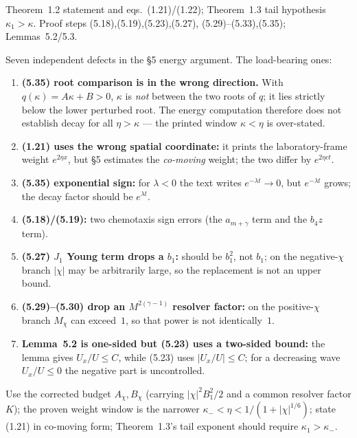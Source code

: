\documentclass[11pt]{article}
\begin{document}
\begin{fields}
\item[Location] Theorem~1.2 statement and eqs.~(1.21)/(1.22); Theorem~1.3 tail
  hypothesis $\kappa_1>\kappa$. Proof steps (5.18),(5.19),(5.23),(5.27),
  (5.29)--(5.33),(5.35); Lemmas~5.2/5.3.
\item[What is wrong] Seven independent defects in the \S5 energy argument. The
  load-bearing ones:
  \begin{enumerate}[leftmargin=1.6em,itemsep=1pt]
  \item \textbf{(5.35) root comparison is in the wrong direction.} With
    $q(\kappa)=A\kappa+B>0$, $\kappa$ is \emph{not} between the two roots of $q$;
    it lies strictly below the lower perturbed root. The energy computation
    therefore does not establish decay for all $\eta>\kappa$ --- the printed
    window $\kappa<\eta$ is over-stated.
  \item \textbf{(1.21) uses the wrong spatial coordinate:} it prints the
    laboratory-frame weight $e^{2\eta x}$, but \S5 estimates the \emph{co-moving}
    weight; the two differ by $e^{2\eta ct}$.
  \item \textbf{(5.35) exponential sign:} for $\lambda<0$ the text writes
    $e^{-\lambda t}\to0$, but $e^{-\lambda t}$ grows; the decay factor should be
    $e^{\lambda t}$.
  \item \textbf{(5.18)/(5.19):} two chemotaxis sign errors (the $a_{m+\gamma}$
    term and the $b_4z$ term).
  \item \textbf{(5.27) $J_1$ Young term drops a $b_1$:} should be $b_1^2$, not
    $b_1$; on the negative-$\chi$ branch $|\chi|$ may be arbitrarily large, so the
    replacement is not an upper bound.
  \item \textbf{(5.29)--(5.30) drop an $M^{2(\gamma-1)}$ resolver factor:} on the
    positive-$\chi$ branch $M_\chi$ can exceed~$1$, so that power is not
    identically~$1$.
  \item \textbf{Lemma~5.2 is one-sided but (5.23) uses a two-sided bound:} the
    lemma gives $U_x/U\le C$, while (5.23) uses $|U_x/U|\le C$; for a decreasing
    wave $U_x/U\le0$ the negative part is uncontrolled.
  \end{enumerate}
\item[Correction] Use the corrected budget $A_\chi,B_\chi$ (carrying
  $|\chi|^2B_1^2/2$ and a common resolver factor $K$); the proven weight window is
  the narrower $\kappa_-<\eta<1/(1+|\chi|^{1/6})$; state (1.21) in co-moving form;
  Theorem~1.3's tail exponent should require $\kappa_1>\kappa_-$.

\end{fields}
\end{document}
